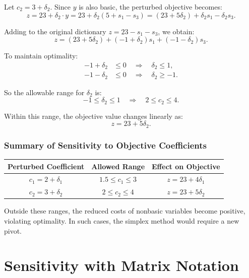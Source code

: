 Let \( c_2 = 3 + \delta_2 \). Since \( y \) is also basic, the perturbed objective becomes:
\[
z = 23 + \delta_2 \cdot y = 23 + \delta_2(5 + s_1 - s_3)
= (23 + 5\delta_2) + \delta_2 s_1 - \delta_2 s_3.
\]

Adding to the original dictionary \( z = 23 - s_1 - s_3 \), we obtain:
\[
z = (23 + 5\delta_2) + (-1 + \delta_2)s_1 + (-1 - \delta_2)s_3.
\]

To maintain optimality:
\[
\begin{aligned}
-1 + \delta_2 &\leq 0 \quad \Rightarrow \quad \delta_2 \leq 1, \\
-1 - \delta_2 &\leq 0 \quad \Rightarrow \quad \delta_2 \geq -1.
\end{aligned}
\]

So the allowable range for \( \delta_2 \) is:
\[
\boxed{-1 \leq \delta_2 \leq 1} \quad \Rightarrow \quad \boxed{2 \leq c_2 \leq 4}.
\]

Within this range, the objective value changes linearly as:
\[
z = 23 + 5\delta_2.
\]

\subsubsection*{Summary of Sensitivity to Objective Coefficients}

\begin{center}
\begin{tabular}{|c|c|c|}
\hline
\textbf{Perturbed Coefficient} & \textbf{Allowed Range} & \textbf{Effect on Objective} \\
\hline
\( c_1 = 2 + \delta_1 \) & \( \boxed{1.5 \leq c_1 \leq 3} \) & \( z = 23 + 4\delta_1 \) \\
\( c_2 = 3 + \delta_2 \) & \( \boxed{2 \leq c_2 \leq 4} \)   & \( z = 23 + 5\delta_2 \) \\
\hline
\end{tabular}
\end{center}

Outside these ranges, the reduced costs of nonbasic variables become positive, violating optimality. In such cases, the simplex method would require a new pivot.


\section{Sensitivity with Matrix Notation}

